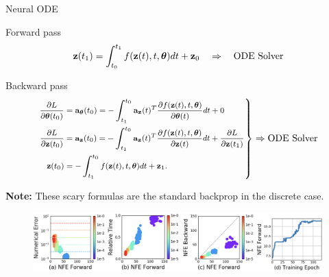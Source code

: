 \begin{frame}{Neural ODE}
	\vspace{-0.2cm}
	\begin{block}{Forward pass}
		\vspace{-0.5cm}
		\[
		\mathbf{z}(t_1) = \int^{t_1}_{t_0} f(\mathbf{z}(t), t, \boldsymbol{\theta}) d t  + \mathbf{z}_0 \quad \Rightarrow \quad \text{ODE Solver}
		\]
		\vspace{-0.6cm}
	\end{block}
	\begin{block}{Backward pass}
		\vspace{-0.8cm}
		\begin{equation*}
			\left.
			{\footnotesize 
				\begin{aligned}
					\frac{\partial L}{\partial \boldsymbol{\theta}(t_0)} &= \mathbf{a}_{\boldsymbol{\theta}}(t_0) =  - \int_{t_1}^{t_0} \mathbf{a}_{\mathbf{z}}(t)^T \frac{\partial f(\mathbf{z}(t), t, \boldsymbol{\theta})}{\partial \boldsymbol{\theta}(t)} dt + 0 \\
					\frac{\partial L}{\partial \mathbf{z}(t_0)} &= \mathbf{a}_{\mathbf{z}}(t_0) =  - \int_{t_1}^{t_0} \mathbf{a}_{\mathbf{z}}(t)^T \frac{\partial f(\mathbf{z}(t), t, \boldsymbol{\theta})}{\partial \mathbf{z}(t)} dt + \frac{\partial L}{\partial \mathbf{z}(t_1)} \\
					\mathbf{z}(t_0) &= - \int^{t_0}_{t_1} f(\mathbf{z}(t), t, \boldsymbol{\theta}) d t  + \mathbf{z}_1.
				\end{aligned}
			}
			\right\rbrace
			\Rightarrow
			\text{ODE Solver}
		\end{equation*}
		\vspace{-0.4cm} 
	\end{block}
	\textbf{Note:} These scary formulas are the standard backprop in the discrete case.
	\begin{figure}
		\centering
		\includegraphics[width=\linewidth]{figs/neural_ode}
	\end{figure}
\end{frame}
